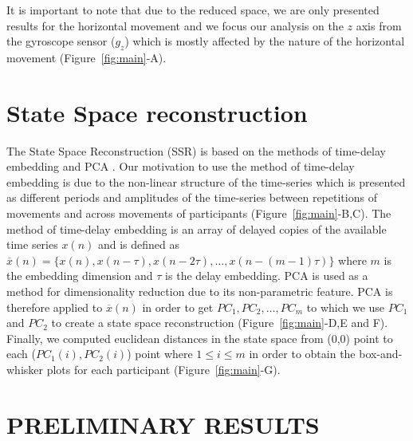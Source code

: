 \documentclass{sig-alternate-05-2015}
\begin{document}
It is important to note that due to the reduced space, we are only presented
results for the horizontal movement and 
we focus our analysis on the $z$ axis from the gyroscope sensor ($g_z$) 
which is mostly affected by the nature of the horizontal movement (Figure~\ref{fig:main}-A).







\section{State Space reconstruction}

The State Space Reconstruction (SSR) is based on the methods of time-delay embedding and PCA \cite{Gibson1992}.
Our motivation to use the method of time-delay embedding
is due to the non-linear structure of the time-series
which is 
presented 
as
different periods and amplitudes of the time-series 
between repetitions of movements and across movements of participants (Figure~\ref{fig:main}-B,C).
The method of time-delay embedding is an array of %
delayed copies of the available time series $x(n)$ and is defined as  
$ \overline{x}(n) = \{  x(n), x(n-\tau), x(n-2\tau), \dots,x(n-(m-1)\tau)\}$
where $m$ is the embedding dimension and $\tau$ is the delay embedding.
PCA is used as a method for dimensionality reduction due to its non-parametric feature.
PCA is therefore applied to $ \overline{x}(n)$ in order to get $PC_1, PC_2, \dots, PC_m$ 
to which we use $PC_1$ and $PC_2$ 
to create a state space reconstruction (Figure~\ref{fig:main}-D,E and F).
Finally, we computed euclidean distances in the state space 
from (0,0) point to each ($PC_1(i),PC_2(i)$) point where $1 \leq i \leq m$
in order to obtain the box-and-whisker plots for each participant (Figure~\ref{fig:main}-G).


\section{PRELIMINARY RESULTS}
\end{document}
